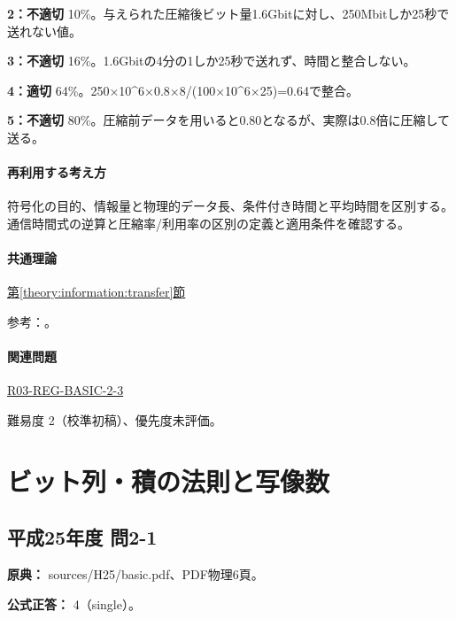 \noindent\textbf{2：不適切} 10\%。与えられた圧縮後ビット量1.6Gbitに対し、250Mbitしか25秒で送れない値。\par

\noindent\textbf{3：不適切} 16\%。1.6Gbitの4分の1しか25秒で送れず、時間と整合しない。\par

\noindent\textbf{4：適切} 64\%。250×10\textasciicircum{}6×0.8×8/(100×10\textasciicircum{}6×25)=\allowbreak{}0.64で整合。\par

\noindent\textbf{5：不適切} 80\%。圧縮前データを用いると0.80となるが、実際は0.8倍に圧縮して送る。\par

\paragraph{再利用する考え方} 符号化の目的、情報量と物理的データ長、条件付き時間と平均時間を区別する。通信時間式の逆算と圧縮率/利用率の区別の定義と適用条件を確認する。

\paragraph{共通理論} \hyperref[theory:information:transfer]{第\ref*{theory:information:transfer}節}

\par 参考：\cite{info_deflate}。

\paragraph{関連問題} \hyperref[q:r03-reg-basic-2-3]{R03-REG-BASIC-2-3}

\par 難易度 2（校準初稿）、優先度未評価。

\section{ビット列・積の法則と写像数}

\subsection{平成25年度 問2-1}
\label{q:h25-reg-basic-2-1}

\noindent\textbf{原典：} sources/H25/basic.pdf、PDF物理6頁。

\textbf{公式正答：} 4（single）。

